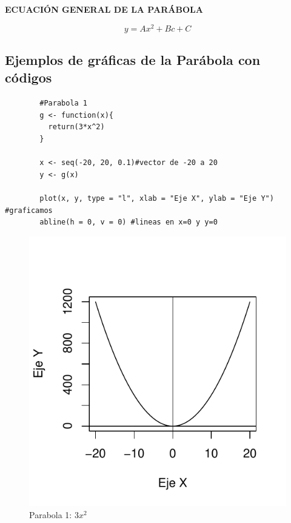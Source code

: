 \documentclass[12pt,a4paper]{article}
\begin{document}
\textbf{ECUACIÓN GENERAL DE LA PARÁBOLA}

\begin{equation}
y = Ax^2 + Bc + C \label{eq:parabola}
\end{equation}

\subsection{Ejemplos de gráficas de la Parábola con códigos} \label{subsec:EPA}
\begin{table}[htpb]
	\begin{lstlisting}
		#Parabola 1
		g <- function(x){
		  return(3*x^2)
		}
		
		x <- seq(-20, 20, 0.1)#vector de -20 a 20
		y <- g(x)

		plot(x, y, type = "l", xlab = "Eje X", ylab = "Eje Y") #graficamos
		abline(h = 0, v = 0) #lineas en x=0 y y=0
	\end{lstlisting}
	\caption{Primer codigo en R para gráficar la parábola de la figura \ref{fig:parabola1}.}
	\label{alg:par1}
\end{table}

\begin{figure}
\centering
\includegraphics[scale=.8]{PA1}
\caption{Parabola 1: $ 3x^2 $}
\label{fig:parabola1}
\end{figure}
\end{document}
